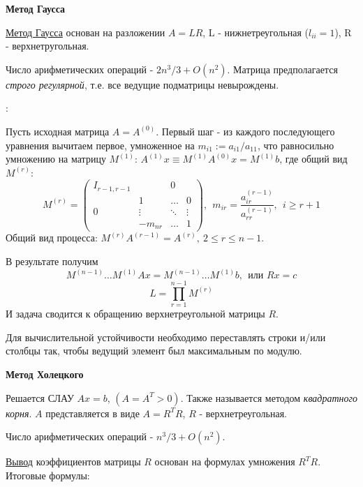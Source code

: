 \documentclass[specialist, subf, href, colorlinks=true, 12pt, times, mtpro, final]{disser}
\theoremstyle{definition}
\begin{document}
    \begin{center} \textbf{Метод Гаусса} \end{center}
    \hyperlink {lects.52}{Метод Гаусса} основан на разложении $A = LR$, L - нижнетреугольная ($l_{ii} = 1$), R - верхнетругольная.
{
    Число арифметических операций - $2n^3/3 + O(n^2)$. Матрица предполагается \emph{строго регулярной}, т.е. все ведущие подматрицы невырождены.
    
    :

    Пусть исходная матрица $A = A^{(0)}$. Первый шаг - из каждого последующего уравнения вычитаем первое, умноженное на $m_{i1} := a_{i1}/a_{11}$, что равносильно умножению на матрицу $M^{(1)}$: $A^{(1)}x \equiv M^{(1)} A^{(0)}x = M^{(1)}b$, где общий вид $M^{(r)}$:
    \begin{equation*}
    M^{(r)} = \left(
    \begin{array}{cccc}
        I_{r-1,r-1} & & 0 & \\
                   & 1& \ldots & 0\\
        0          & \vdots& \ddots & \vdots\\
                   & -m_{nr} & \ldots & 1
        \end{array}
        \right), \ \ 
        m_{ir} = \frac{a_{ir}^{(r-1)}}{a_{rr}^{(r-1)}}, \ \
        i \ge r + 1
    \end{equation*}
    Общий вид процесса: $M^{(r)}A^{(r-1)} = A^{(r)}, \ 2 \le r \le n-1$.

    В результате получим
    $$M^{(n-1)} \dots M^{(1)} Ax = M^{(n-1)} \dots M^{(1)} b, \ \ \text{или } Rx = c$$
    $$L = \prod \limits_{r=1}^{n-1} M^{(r)}$$
    И задача сводится к обращению верхнетреугольной матрицы $R$. 
        
    Для вычислительной устойчивости необходимо переставлять строки и/или столбцы так, чтобы ведущий элемент был максимальным по модулю.  

    \begin{center} \textbf{Метод Холецкого} \end{center}
    Решается СЛАУ $Ax = b$, $(A = A^T > 0)$. Также называется методом \emph{квадратного корня}. $A$ представляется в виде $A = R^TR$, $R$ - верхнетреугольная.
    
    Число арифметических операций - $n^3/3 + O(n^2)$.

    \hyperlink {lects.53}{Вывод} коэффициентов матрицы $R$ основан на формулах умножения $R^TR$. Итоговые формулы:

}
\end{document}
